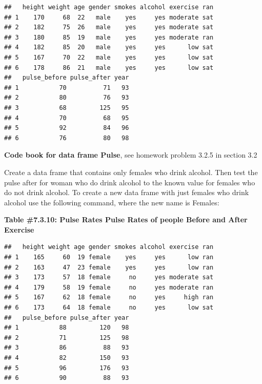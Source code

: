 \documentclass[
]{book}
\newenvironment{Shaded}{\begin{snugshade}}{\end{snugshade}}
\newcommand{\KeywordTok}[1]{\textcolor[rgb]{0.13,0.29,0.53}{\textbf{#1}}}
\newcommand{\NormalTok}[1]{#1}
\newcommand{\OperatorTok}[1]{\textcolor[rgb]{0.81,0.36,0.00}{\textbf{#1}}}
\newcommand{\StringTok}[1]{\textcolor[rgb]{0.31,0.60,0.02}{#1}}
\begin{document}
\begin{verbatim}
##   height weight age gender smokes alcohol exercise ran
## 1    170     68  22   male    yes     yes moderate sat
## 2    182     75  26   male    yes     yes moderate sat
## 3    180     85  19   male    yes     yes moderate ran
## 4    182     85  20   male    yes     yes      low sat
## 5    167     70  22   male    yes     yes      low sat
## 6    178     86  21   male    yes     yes      low sat
##   pulse_before pulse_after year
## 1           70          71   93
## 2           80          76   93
## 3           68         125   95
## 4           70          68   95
## 5           92          84   96
## 6           76          80   98
\end{verbatim}

\textbf{Code book for data frame Pulse}, see homework problem 3.2.5 in section 3.2

Create a data frame that contains only females who drink alcohol. Then test the pulse after for woman who do drink alcohol to the known value for females who do not drink alcohol. To create a new data frame with just females who drink alcohol use the following command, where the new name is Females:

\textbf{Table \#7.3.10: Pulse Rates Pulse Rates of people Before and After Exercise}

\begin{Shaded}
\end{Shaded}

\begin{verbatim}
##   height weight age gender smokes alcohol exercise ran
## 1    165     60  19 female    yes     yes      low ran
## 2    163     47  23 female    yes     yes      low ran
## 3    173     57  18 female     no     yes moderate sat
## 4    179     58  19 female     no     yes moderate ran
## 5    167     62  18 female     no     yes     high ran
## 6    173     64  18 female     no     yes      low sat
##   pulse_before pulse_after year
## 1           88         120   98
## 2           71         125   98
## 3           86          88   93
## 4           82         150   93
## 5           96         176   93
## 6           90          88   93
\end{verbatim}
\end{document}
